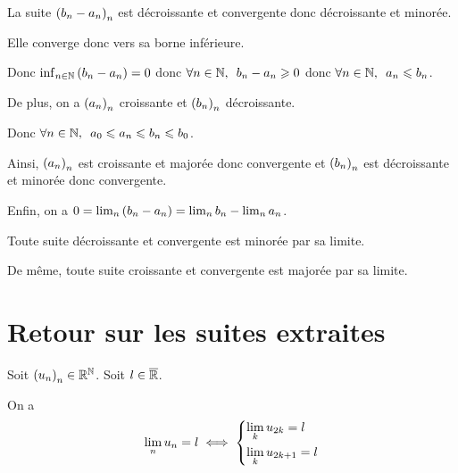 \begin{dem}
La suite \(\left(b_n-a_n\right)_n\) est décroissante et convergente donc décroissante et minorée.

Elle converge donc vers sa borne inférieure.

Donc \(\inf_{n\in\mathbb{N}}\left(b_n-a_n\right)=0\) donc \(\quantifs{\forall n\in\N}b_n-a_n\geq0\) donc \(\quantifs{\forall n\in\N}a_n\leq b_n\).

De plus, on a \(\left(a_n\right)_n\) croissante et \(\left(b_n\right)_n\) décroissante.

Donc \(\quantifs{\forall n\in\N}a_0\leq a_n\leq b_n\leq b_0\).

Ainsi, \(\left(a_n\right)_n\) est croissante et majorée donc convergente et \(\left(b_n\right)_n\) est décroissante et minorée donc convergente.

Enfin, on a \(0=\lim_n\left(b_n-a_n\right)=\lim_nb_n-\lim_na_n\).
\end{dem}

\begin{rem}
Toute suite décroissante et convergente est minorée par sa limite.

De même, toute suite croissante et convergente est majorée par sa limite.
\end{rem}

\section{Retour sur les suites extraites}

\begin{prop}
Soit \(\left(u_n\right)_n\in\mathbb{R}^{\mathbb{N}}\). Soit \(l\in\overline{\mathbb{R}}\).

On a \[\lim_nu_n=l\iff\begin{dcases}\lim_ku_{2k}=l \\ \lim_ku_{2k+1}=l\end{dcases}\]
\end{prop}

